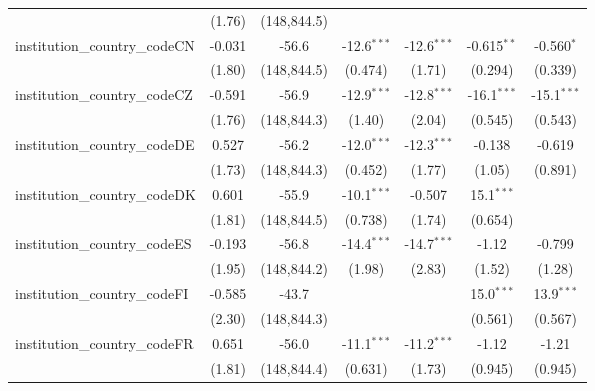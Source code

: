 \begin{tabular}{lcccccc}
                                         & (1.76)        & (148,844.5)   &               &               &               &   \\   
   institution\_country\_codeCN          & -0.031        & -56.6         & -12.6$^{***}$ & -12.6$^{***}$ & -0.615$^{**}$ & -0.560$^{*}$\\   
                                         & (1.80)        & (148,844.5)   & (0.474)       & (1.71)        & (0.294)       & (0.339)\\   
   institution\_country\_codeCZ          & -0.591        & -56.9         & -12.9$^{***}$ & -12.8$^{***}$ & -16.1$^{***}$ & -15.1$^{***}$\\   
                                         & (1.76)        & (148,844.3)   & (1.40)        & (2.04)        & (0.545)       & (0.543)\\   
   institution\_country\_codeDE          & 0.527         & -56.2         & -12.0$^{***}$ & -12.3$^{***}$ & -0.138        & -0.619\\   
                                         & (1.73)        & (148,844.3)   & (0.452)       & (1.77)        & (1.05)        & (0.891)\\   
   institution\_country\_codeDK          & 0.601         & -55.9         & -10.1$^{***}$ & -0.507        & 15.1$^{***}$  &   \\   
                                         & (1.81)        & (148,844.5)   & (0.738)       & (1.74)        & (0.654)       &   \\   
   institution\_country\_codeES          & -0.193        & -56.8         & -14.4$^{***}$ & -14.7$^{***}$ & -1.12         & -0.799\\   
                                         & (1.95)        & (148,844.2)   & (1.98)        & (2.83)        & (1.52)        & (1.28)\\   
   institution\_country\_codeFI          & -0.585        & -43.7         &               &               & 15.0$^{***}$  & 13.9$^{***}$\\   
                                         & (2.30)        & (148,844.3)   &               &               & (0.561)       & (0.567)\\   
   institution\_country\_codeFR          & 0.651         & -56.0         & -11.1$^{***}$ & -11.2$^{***}$ & -1.12         & -1.21\\   
                                         & (1.81)        & (148,844.4)   & (0.631)       & (1.73)        & (0.945)       & (0.945)\\   

\end{tabular}
